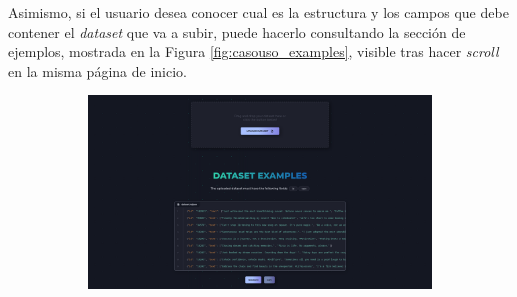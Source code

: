 \bigskip
Asimismo, si el usuario desea conocer cual es la estructura y los campos que debe contener el \textit{dataset} que va a subir,
puede hacerlo consultando la sección de ejemplos, mostrada en la Figura \ref{fig:casouso_examples}, visible tras hacer \textit{scroll}
en la misma página de inicio.

\bigskip
\begin{figure}[H]
	\centering
	\begin{subfigure}[c]{0.74\textwidth}
			\centering
			\includegraphics[width=\textwidth]{imagenes/examples.png}
			\label{fig:casouso_examples_escritorio}
	\end{subfigure}
	\hfill
	\begin{subfigure}[c]{0.21\textwidth}
			\centering

\end{subfigure}
\end{figure}
